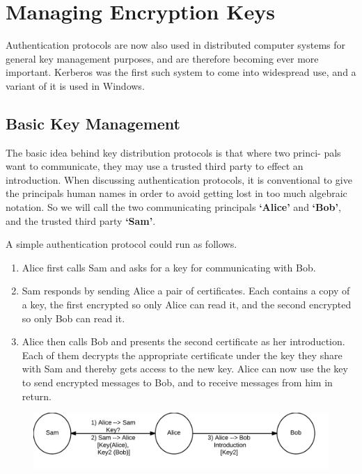 \section{Managing Encryption Keys}

	Authentication protocols are now also used in distributed computer systems
	for general key management purposes, and are therefore becoming ever more
	important. Kerberos was the first such system to come into widespread use,
	and a variant of it is used in Windows. 

	\subsection{Basic Key Management}
		The basic idea behind key distribution protocols is that where two princi-
		pals want to communicate, they may use a trusted third party to effect an
		introduction.
		When discussing authentication protocols, it is conventional to give the
		principals human names in order to avoid getting lost in too much algebraic
		notation. So we will call the two communicating principals {\bf ‘Alice’} and 
		{\bf ‘Bob’}, and the trusted third party {\bf ‘Sam’}. 

		A simple authentication protocol could run as follows.
		\begin{enumerate}
			\item Alice first calls Sam and asks for a key for communicating with Bob.
			\item Sam responds by sending Alice a pair of certificates. Each contains a copy
			of a key, the first encrypted so only Alice can read it, and the second
			encrypted so only Bob can read it.
			\item Alice then calls Bob and presents the second certificate as her introduction.
			Each of them decrypts the appropriate certificate under the key they share
			with Sam and thereby gets access to the new key. Alice can now use the
			key to send encrypted messages to Bob, and to receive messages from him
			in return.
		\end{enumerate}

		\begin{figure}[H]
			\centering
			\includegraphics[scale=0.20]{pics/BobAliceSam1.png}
		\end{figure}

